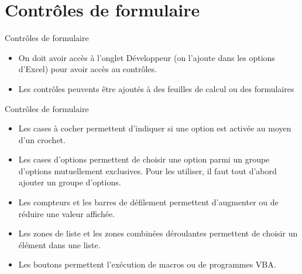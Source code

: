 \documentclass[aspectratio=169,usenames,dvipsnames]{beamer}
\begin{document}
    \section{Contrôles de formulaire}
    \begin{frame}{Contrôles de formulaire}
        \begin{itemize}
            \item On doit avoir accès à l’onglet Développeur (on l’ajoute dans les options d’Excel) pour avoir accès au contrôles.
            \item Les contrôles peuvents être ajoutés à des feuilles de calcul ou des formulaires
        \end{itemize}
    \end{frame}
    \begin{frame}{Contrôles de formulaire}
        \begin{itemize}
            \item Les cases à cocher permettent d'indiquer si une option est activée au moyen d'un crochet.
            \item Les cases d'options permettent de choisir une option parmi un groupe d'options mutuellement exclusives. Pour les utiliser, il faut tout d'abord ajouter un groupe d'options.
            \item Les compteurs et les barres de défilement permettent d'augmenter ou de réduire une valeur affichée.
            \item Les zones de liste et les zones combinées déroulantes permettent de choisir un élément dans une liste.
            \item Les boutons permettent l'exécution de macros ou de programmes VBA.
        \end{itemize}
    \end{frame}
\end{document}
